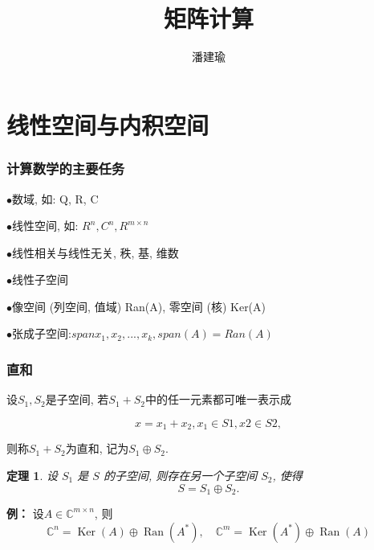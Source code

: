 \documentclass[notheorems,serif]{beamer}
\newcommand{\hei}[1]{{\HEI#1}}
\newtheorem{theorem}{\hei{定理}}
\begin{document}
\title[数值线性代数]{{\small{}~~~~~~~~~~~~~~~~~~~~~~~~~~~~~~~~~~~~~~~~~~~~~~
~~~~~~~~~~~} \\
矩阵计算
}




\author[]{~~潘建瑜~~}

\institute[湘潭大学数学系]

\date[\today]




\frame[plain]{\titlepage}


\section{线性空间与内积空间}
\begin{frame}
\frametitle{计算数学的主要任务}
$\bullet$数域, 如: Q, R, C

$\bullet$线性空间, 如: $R^n,C^n,R^{m×n}$

$\bullet$线性相关与线性无关, 秩, 基, 维数

$\bullet$线性子空间

$\bullet$像空间 (列空间, 值域) Ran(A), 零空间 (核) Ker(A)

$\bullet$张成子空间:$span{x_1, x_2, . . . , x_k}, span(A) = Ran(A)$
\end{frame}
\begin{frame}
\frametitle{直和}
设$S_1, S_2$是子空间, 若$S_1 + S_2$中的任一元素都可唯一表示成

$$x = x_1 + x_2, x_1 ∈ S1, x2 ∈ S2,$$

则称$S_1 + S_2$为直和, 记为$S_1 ⊕ S_2$.


\begin{theorem}
	
	设 $S_1$ 是 $S$ 的子空间, 则存在另一个子空间 $S_2$, 使得$$S = S_1 \oplus S_2.$$
	
\end{theorem}

{\bfseries  例：} \quad 设$A ∈\mathbb{C}^{m×n}$, 则
$$\mathbb{C}^{n}=\operatorname{Ker}(A) \oplus \operatorname{Ran}\left(A^{*}\right), \quad \mathbb{C}^{m}=\operatorname{Ker}\left(A^{*}\right) \oplus \operatorname{Ran}(A)$$ 
\end{frame}
\end{document}
